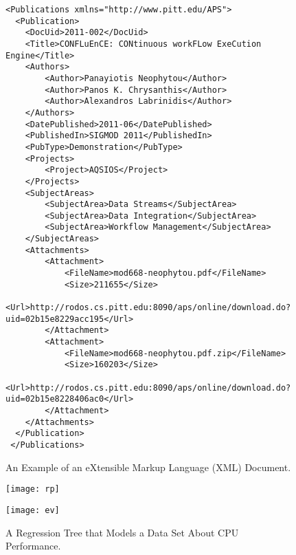 \documentclass[12pt]{article}
\begin{document}
\begin{figure}[p]

\vspace*{-.5in}

\centering

{\footnotesize 
\begin{verbatim}
<Publications xmlns="http://www.pitt.edu/APS">
  <Publication>
    <DocUid>2011-002</DocUid>
    <Title>CONFLuEnCE: CONtinuous workFLow ExeCution Engine</Title>
    <Authors>
        <Author>Panayiotis Neophytou</Author>
        <Author>Panos K. Chrysanthis</Author>
        <Author>Alexandros Labrinidis</Author>
    </Authors>
    <DatePublished>2011-06</DatePublished>
    <PublishedIn>SIGMOD 2011</PublishedIn>
    <PubType>Demonstration</PubType>
    <Projects>
        <Project>AQSIOS</Project>
    </Projects>
    <SubjectAreas>
        <SubjectArea>Data Streams</SubjectArea>
        <SubjectArea>Data Integration</SubjectArea>
        <SubjectArea>Workflow Management</SubjectArea>
    </SubjectAreas>
    <Attachments>
        <Attachment>
            <FileName>mod668-neophytou.pdf</FileName>
            <Size>211655</Size>
            <Url>http://rodos.cs.pitt.edu:8090/aps/online/download.do?uid=02b15e8229acc195</Url>
        </Attachment>
        <Attachment>
            <FileName>mod668-neophytou.pdf.zip</FileName>
            <Size>160203</Size>
            <Url>http://rodos.cs.pitt.edu:8090/aps/online/download.do?uid=02b15e8228406ac0</Url>
        </Attachment>
    </Attachments>
  </Publication>
 </Publications>
\end{verbatim} }

\caption{An Example of an eXtensible Markup Language (XML) Document.}
\label{figure:xml}
\end{figure}


\begin{figure}[p]
\centering

\vspace*{-.6in}

\begin{center}
\texttt{[image: rp]}
\end{center}

\vspace*{-.75in}

\begin{center}
\texttt{[image: ev]}
\end{center}

\vspace*{-.25in}

\caption{A Regression Tree that Models a Data Set About CPU Performance.}
\label{fig:trees}
\vspace*{-.25in}
\end{figure}
\end{document}
